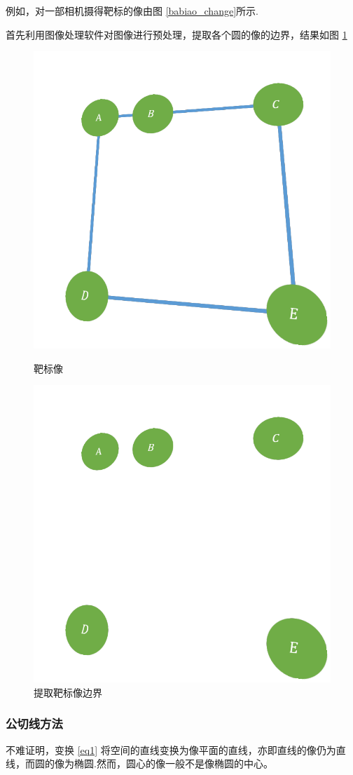 \documentclass{article}
\numberwithin{equation}{section}						%
\numberwithin{figure}{section}							%
\begin{document}
\begin{sloppypar}
	例如，对一部相机摄得靶标的像由图 \ref{babiao_change}所示.
	
	首先利用图像处理软件对图像进行预处理，提取各个圆的像的边界，结果如图 \ref{babiao_change1}
	\begin{figure}[H]
		\begin{minipage}{0.5\linewidth}
			\centering
			\includegraphics[width=0.7\linewidth]{babiao_change}
			\caption{靶标像}
			\label{babiao_change}
		\end{minipage}
		\begin{minipage}{0.5\linewidth}
			\centering
			\includegraphics[width=0.7\linewidth]{babiao_change1}
			\caption{提取靶标像边界}
			\label{babiao_change1}
		\end{minipage}
	\end{figure}
	\subsubsection{公切线方法}
	不难证明，变换 \ref{eq1} 将空间的直线变换为像平面的直线，亦即直线的像仍为直线，而圆的像为椭圆.然而，圆心的像一般不是像椭圆的中心。
	

\end{sloppypar}
\end{document}
